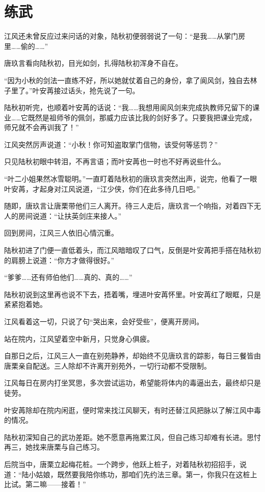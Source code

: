 \chapter{练武}
江风还未曾反应过来问话的对象，陆秋初便弱弱说了一句：“是我……从掌门房里……偷的……”

唐玖言看向陆秋初，目光如剑，扎得陆秋初浑身不自在。

“因为小秋的剑法一直练不好，所以她就仗着自己的身份，拿了阆风剑，独自去林子里了。”叶安苒接过话头，抢先说了一句。

陆秋初听完，也顺着叶安苒的话说：“我……我想用阆风剑来完成执教师兄留下的课业……它既然是祖师爷的佩剑，那威力应该比我的剑好多了。只要我把课业完成，师兄就不会再训我了！”

江风突然厉声说道：“小秋！你可知盗取掌门信物，该受何等惩罚？”

只见陆秋初眼中转泪，不再言语；而叶安苒也一时也不好再说些什么。

“叶二小姐果然冰雪聪明。”一直盯着陆秋初的唐玖言突然出声，说完，他看了一眼叶安苒，才起身对江风说道，“江少侠，你们在此多待几日吧。”

随即，唐玖言让唐栗带他们三人离开。待三人走后，唐玖言一个响指，对着四下无人的房间说道：“让扶英剑庄来接人。”

回到房间，江风三人依旧心情沉重。

陆秋初进了门便一直低着头，而江风暗暗叹了口气，反倒是叶安苒把手搭在陆秋初的肩膀上说道：“你方才做得很好。”

“爹爹……还有师伯他们……真的、真的……”

陆秋初说到这里再也说不下去，捂着嘴，埋进叶安苒怀里。叶安苒红了眼眶，只是紧紧抱着她。

江风看着这一切，只说了句“哭出来，会好受些”，便离开房间。

站在院内，江风望着空中新月，只觉身心俱疲。

自那日之后，江风三人一直在别苑静养，却始终不见唐玖言的踪影，每日三餐皆由唐栗亲自配送。三人除却不许离开别苑外，一切行动都不受限制。

江风每日在房内打坐冥思，多次尝试运功，希望能将体内的毒逼出去，最终却只是徒劳。

叶安苒除却在院内闲逛，便时常来找江风聊天，有时还替江风把脉以了解江风中毒的情况。

陆秋初深知自己的武功差距。她不愿意再拖累江风，但自己练习却难有长进。思忖再三，她找来唐栗与自己练习。

后院当中，唐栗立起梅花桩。一个跨步，他跃上桩子，对着陆秋初招招手，说道：“陆小姑娘，既然要我陪你练功，那咱们先约法三章。第一，你我只在这桩上比试。第二嘛——接着！”

